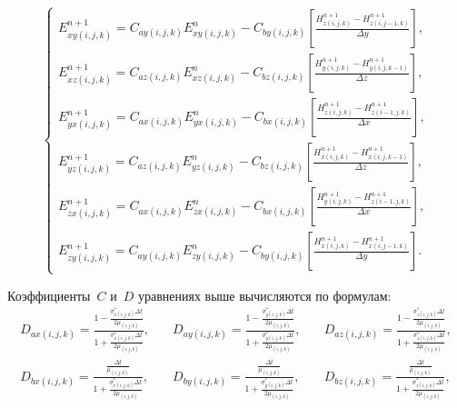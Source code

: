 \begin{equation*}
\left\{
\begin{aligned}
E_{xy (i,j,k)}^{n+1} = C_{ay (i,j,k)} E_{xy (i,j,k)}^{n} - C_{by (i,j,k)}
\left[
    \frac{H_{z (i,j,k)}^{n+1} - H_{z (i,j-1,k)}^{n+1}}{\Delta y}
\right], \\
E_{xz (i,j,k)}^{n+1} = C_{az (i,j,k)} E_{xz (i,j,k)}^{n} - C_{bz (i,j,k)}
\left[
    \frac{H_{y (i,j,k)}^{n+1} - H_{y (i,j,k-1)}^{n+1}}{\Delta z}
\right], \\
E_{yx (i,j,k)}^{n+1} = C_{ax (i,j,k)} E_{yx (i,j,k)}^{n} - C_{bx (i,j,k)}
\left[
    \frac{H_{z (i,j,k)}^{n+1} - H_{z (i-1,j,k)}^{n+1}}{\Delta x}
\right], \\
E_{yz (i,j,k)}^{n+1} = C_{az (i,j,k)} E_{yz (i,j,k)}^{n} - C_{bz (i,j,k)}
\left[
    \frac{H_{x (i,j,k)}^{n+1} - H_{x (i,j,k-1)}^{n+1}}{\Delta z}
\right], \\
E_{zx (i,j,k)}^{n+1} = C_{ax (i,j,k)} E_{zx (i,j,k)}^{n} - C_{bx (i,j,k)}
\left[
    \frac{H_{y (i,j,k)}^{n+1} - H_{z (i-1,j,k)}^{n+1}}{\Delta x}
\right], \\
E_{zy (i,j,k)}^{n+1} = C_{ay (i,j,k)} E_{zy (i,j,k)}^{n} - C_{by (i,j,k)}
\left[
    \frac{H_{x (i,j,k)}^{n+1} - H_{x (i,j-1,k)}^{n+1}}{\Delta y}
\right].
\end{aligned}
\right.
\end{equation*}

Коэффициенты~$C$ и~$D$ уравнениях выше вычисляются по формулам:
\begin{equation*}
\begin{aligned}
D_{ax (i,j,k)} =
\frac
{
    1-\frac{\sigma_{x (i,j,k)}^*\Delta t}{2\mu_{(i,j,k)}}
}{
    1+\frac{\sigma_{x (i,j,k)}^*\Delta t}{2\mu_{(i,j,k)}}
}, \\
D_{bx (i,j,k)} =
\frac
{
    \frac{\Delta t}{\mu_{(i,j,k)}}
}{
    1+\frac{\sigma_{x (i,j,k)}^*\Delta t}{2\mu_{(i,j,k)}}
},
\end{aligned}
\quad
\begin{aligned}
D_{ay (i,j,k)} =
\frac
{
    1-\frac{\sigma_{y (i,j,k)}^*\Delta t}{2\mu_{(i,j,k)}}
}{
    1+\frac{\sigma_{y (i,j,k)}^*\Delta t}{2\mu_{(i,j,k)}}
}, \\
D_{by (i,j,k)} =
\frac
{
    \frac{\Delta t}{\mu_{(i,j,k)}}
}{
    1+\frac{\sigma_{y (i,j,k)}^*\Delta t}{2\mu_{(i,j,k)}}
},
\end{aligned}
\quad
\begin{aligned}
D_{az (i,j,k)} =
\frac
{
    1-\frac{\sigma_{z (i,j,k)}^*\Delta t}{2\mu_{(i,j,k)}}
}{
    1+\frac{\sigma_{z (i,j,k)}^*\Delta t}{2\mu_{(i,j,k)}}
}, \\
D_{bz (i,j,k)} =
\frac
{
    \frac{\Delta t}{\mu_{(i,j,k)}}
}{
    1+\frac{\sigma_{z (i,j,k)}^*\Delta t}{2\mu_{(i,j,k)}}
},
\end{aligned}
\end{equation*}

